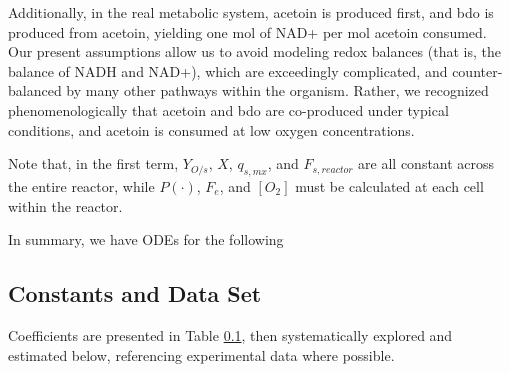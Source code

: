 \documentclass[11pt]{article} %
\begin{document}
Additionally, in the real metabolic system, acetoin is produced first, and bdo is produced from acetoin, yielding one mol of NAD+ per mol acetoin consumed. Our present assumptions allow us to avoid modeling redox balances (that is, the balance of NADH and NAD+), which are exceedingly complicated, and counter-balanced by many other pathways within the organism. Rather, we recognized phenomenologically that acetoin and bdo are co-produced under typical conditions, and acetoin is consumed at low oxygen concentrations.
%

Note that, in the first term, $Y_{O/s}$,  $X$,  $q_{s,mx}$, and  $F_{s,reactor}$ are all constant across the entire reactor, while $P(\cdot)$, $F_e$, and $[O_2]$ must be calculated at each cell within the reactor. 

In summary, we have ODEs for the following 
 

\subsection{Constants and Data Set}

Coefficients are presented in Table \ref{}, then systematically explored and estimated below, referencing experimental data where possible.
\end{document}

